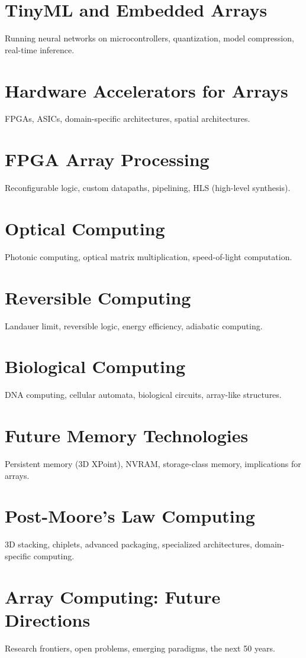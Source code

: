 \chapter{TinyML and Embedded Arrays}
Running neural networks on microcontrollers, quantization, model compression, real-time inference.

\chapter{Hardware Accelerators for Arrays}
FPGAs, ASICs, domain-specific architectures, spatial architectures.

\chapter{FPGA Array Processing}
Reconfigurable logic, custom datapaths, pipelining, HLS (high-level synthesis).

\chapter{Optical Computing}
Photonic computing, optical matrix multiplication, speed-of-light computation.

\chapter{Reversible Computing}
Landauer limit, reversible logic, energy efficiency, adiabatic computing.

\chapter{Biological Computing}
DNA computing, cellular automata, biological circuits, array-like structures.

\chapter{Future Memory Technologies}
Persistent memory (3D XPoint), NVRAM, storage-class memory, implications for arrays.

\chapter{Post-Moore's Law Computing}
3D stacking, chiplets, advanced packaging, specialized architectures, domain-specific computing.

\chapter{Array Computing: Future Directions}
Research frontiers, open problems, emerging paradigms, the next 50 years.